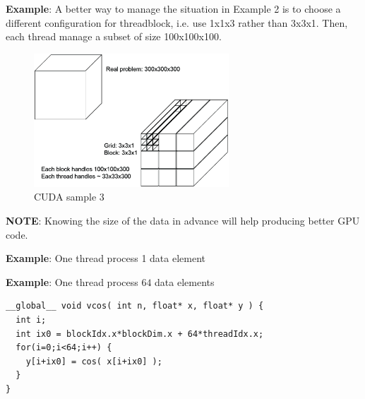 {\bf Example}: A better way to manage the situation in Example 2 is to
choose a different configuration for threadblock, i.e. use 1x1x3
rather than 3x3x1. Then, each thread manage a subset of size
100x100x100.

\begin{figure}[hbt]
  \centerline{\includegraphics[height=5cm,
    angle=0]{./images/cuda_sample3.eps}}
\caption{CUDA sample 3}
\label{fig:cuda_sample3}
\end{figure}

\begin{framed}
  
{\bf NOTE}: Knowing the size of the data in advance will help
producing better GPU code.

\end{framed}

{\bf Example}: One thread process 1 data element

{\bf Example}: One thread process $64$ data elements
\begin{lstlisting}
__global__ void vcos( int n, float* x, float* y ) {
  int i;
  int ix0 = blockIdx.x*blockDim.x + 64*threadIdx.x;
  for(i=0;i<64;i++) {
    y[i+ix0] = cos( x[i+ix0] );
  }
}
\end{lstlisting}


